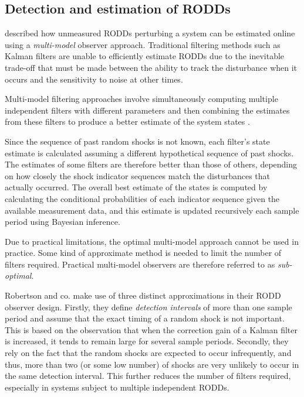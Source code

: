 \subsection{Detection and estimation of RODDs}\label{detection_RODDs}

\cite{robertson_detection_1995} described how unmeasured RODDs perturbing a system can be estimated online using a \textit{multi-model} observer approach. Traditional filtering methods such as Kalman filters are unable to efficiently estimate RODDs due to the inevitable trade-off that must be made between the ability to track the disturbance when it occurs and the sensitivity to noise at other times.

Multi-model filtering approaches involve simultaneously computing multiple independent filters with different parameters and then combining the estimates from these filters to produce a better estimate of the system states \citep{jaffer_estimation_1971, buxbaum_recursive_1970, tugnait_detection_1982}.

Since the sequence of past random shocks is not known, each filter's state estimate is calculated assuming a different hypothetical sequence of past shocks. The estimates of some filters are therefore better than those of others, depending on how closely the shock indicator sequences match the disturbances that actually occurred. The overall best estimate of the states is computed by calculating the conditional probabilities of each indicator sequence given the available measurement data, and this estimate is updated recursively each sample period using Bayesian inference.

Due to practical limitations, the optimal multi-model approach cannot be used in practice. Some kind of approximate method is needed to limit the number of filters required. Practical multi-model observers are therefore referred to as \textit{sub-optimal}.

Robertson and co. make use of three distinct approximations in their RODD observer design. Firstly, they define \textit{detection intervals} of more than one sample period and assume that the exact timing of a random shock is not important. This is based on the observation that when the correction gain of a Kalman filter is increased, it tends to remain large for several sample periods. Secondly, they rely on the fact that the random shocks are expected to occur infrequently, and thus, more than two (or some low number) of shocks are very unlikely to occur in the same detection interval. This further reduces the number of filters required, especially in systems subject to multiple independent RODDs.

